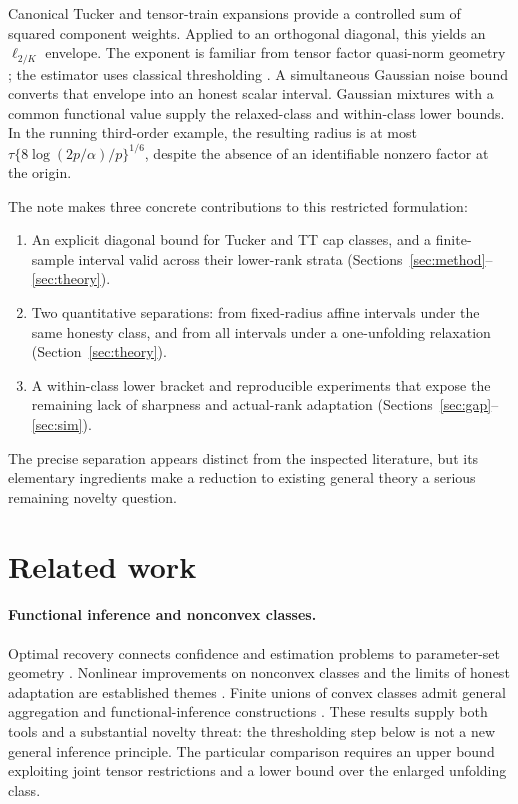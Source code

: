 \documentclass[11pt]{article}
\theoremstyle{remark}
\begin{document}
Canonical Tucker and tensor-train expansions provide a controlled sum of squared component weights. Applied to an orthogonal diagonal, this yields an $\ell_{2/K}$ envelope. The exponent is familiar from tensor factor quasi-norm geometry \citep{fan2023}; the estimator uses classical thresholding \citep{donohojohnstone1994}. A simultaneous Gaussian noise bound converts that envelope into an honest scalar interval. Gaussian mixtures with a common functional value supply the relaxed-class and within-class lower bounds. In the running third-order example, the resulting radius is at most $\tau\{8\log(2p/\alpha)/p\}^{1/6}$, despite the absence of an identifiable nonzero factor at the origin.

The note makes three concrete contributions to this restricted formulation:
\begin{enumerate}
\item An explicit diagonal bound for Tucker and TT cap classes, and a finite-sample interval valid across their lower-rank strata (Sections~\ref{sec:method}--\ref{sec:theory}).
\item Two quantitative separations: from fixed-radius affine intervals under the same honesty class, and from all intervals under a one-unfolding relaxation (Section~\ref{sec:theory}).
\item A within-class lower bracket and reproducible experiments that expose the remaining lack of sharpness and actual-rank adaptation (Sections~\ref{sec:gap}--\ref{sec:sim}).
\end{enumerate}
The precise separation appears distinct from the inspected literature, but its elementary ingredients make a reduction to existing general theory a serious remaining novelty question.

\section{Related work}\label{sec:related}

\paragraph{Functional inference and nonconvex classes.}
Optimal recovery connects confidence and estimation problems to parameter-set geometry \citep{donoho1994}. Nonlinear improvements on nonconvex classes and the limits of honest adaptation are established themes \citep{cailownonconvex2004,cailow2004,low1997}. Finite unions of convex classes admit general aggregation and functional-inference constructions \citep{juditskynemirovski2020}. These results supply both tools and a substantial novelty threat: the thresholding step below is not a new general inference principle. The particular comparison requires an upper bound exploiting joint tensor restrictions and a lower bound over the enlarged unfolding class.
\end{document}
